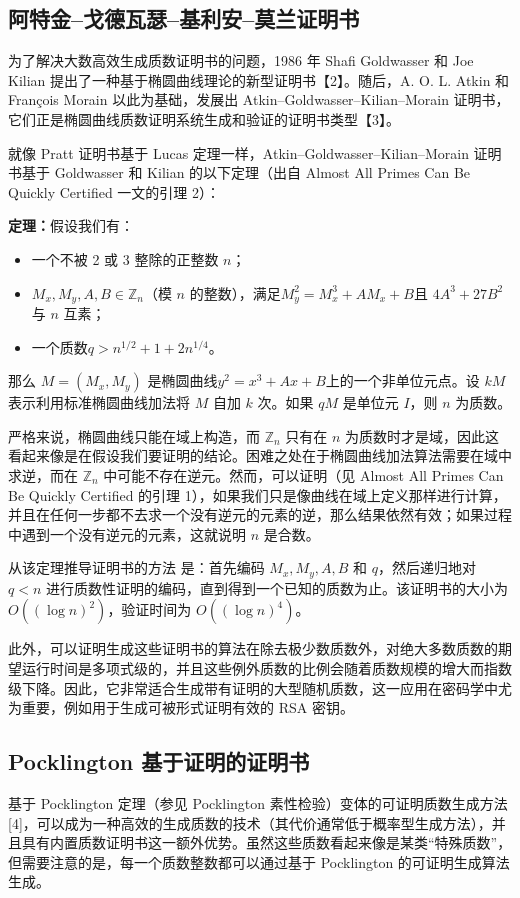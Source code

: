\subsection{阿特金–戈德瓦瑟–基利安–莫兰证明书}
为了解决大数高效生成质数证明书的问题，1986 年 Shafi Goldwasser 和 Joe Kilian 提出了一种基于椭圆曲线理论的新型证明书【2】。随后，A. O. L. Atkin 和 François Morain 以此为基础，发展出 Atkin–Goldwasser–Kilian–Morain 证明书，它们正是椭圆曲线质数证明系统生成和验证的证明书类型【3】。

就像 Pratt 证明书基于 Lucas 定理一样，Atkin–Goldwasser–Kilian–Morain 证明书基于 Goldwasser 和 Kilian 的以下定理（出自 Almost All Primes Can Be Quickly Certified 一文的引理 2）：

\textbf{定理：}假设我们有：
\begin{itemize}
\item 一个不被 2 或 3 整除的正整数 $n$；
\item $M_x, M_y, A, B \in \mathbb{Z}_n$（模 $n$ 的整数），满足$M_y^2 = M_x^3 + A M_x + B$且 $4A^3 + 27B^2$ 与 $n$ 互素；
\item 一个质数$q > n^{1/2} + 1 + 2n^{1/4}$。
\end{itemize}
那么 $M = (M_x, M_y)$ 是椭圆曲线$y^2 = x^3 + A x + B$上的一个非单位元点。设 $kM$ 表示利用标准椭圆曲线加法将 $M$ 自加 $k$ 次。如果 $qM$ 是单位元 $I$，则 $n$ 为质数。

严格来说，椭圆曲线只能在域上构造，而 $\mathbb{Z}_n$ 只有在 $n$ 为质数时才是域，因此这看起来像是在假设我们要证明的结论。困难之处在于椭圆曲线加法算法需要在域中求逆，而在 $\mathbb{Z}_n$ 中可能不存在逆元。然而，可以证明（见 Almost All Primes Can Be Quickly Certified 的引理 1），如果我们只是像曲线在域上定义那样进行计算，并且在任何一步都不去求一个没有逆元的元素的逆，那么结果依然有效；如果过程中遇到一个没有逆元的元素，这就说明 $n$ 是合数。

从该定理推导证明书的方法 是：首先编码 $M_x, M_y, A, B$ 和 $q$，然后递归地对 $q < n$ 进行质数性证明的编码，直到得到一个已知的质数为止。该证明书的大小为 $O((\log n)^2)$，验证时间为 $O((\log n)^4)$。

此外，可以证明生成这些证明书的算法在除去极少数质数外，对绝大多数质数的期望运行时间是多项式级的，并且这些例外质数的比例会随着质数规模的增大而指数级下降。因此，它非常适合生成带有证明的大型随机质数，这一应用在密码学中尤为重要，例如用于生成可被形式证明有效的 RSA 密钥。
\subsection{Pocklington 基于证明的证明书}
基于 Pocklington 定理（参见 Pocklington 素性检验）变体的可证明质数生成方法[4]，可以成为一种高效的生成质数的技术（其代价通常低于概率型生成方法），并且具有内置质数证明书这一额外优势。虽然这些质数看起来像是某类“特殊质数”，但需要注意的是，每一个质数整数都可以通过基于 Pocklington 的可证明生成算法生成。
